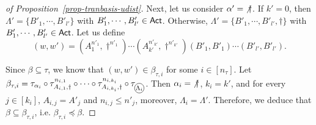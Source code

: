 \begin{proof}[of Proposition~\ref{prop-tranbasis-udist}]
Next, let us consider $\alpha' = {\not \dag}$. If $k' = 0$, then $\Lambda' = \{B'_1, \cdots, B'_{l'}\}$ with $B'_{1}, \cdots, B'_{ l'} \in {\sf Act}$. Otherwise,  $\Lambda' = \{ B'_{1}, \cdots, B'_{l'}, \dag\}$ with $B'_{1}, \cdots, B'_{ l'} \in {\sf Act}$.
Let us define 
$$(w, w') = (A^{n'_{1}}_{1}, \dag^{n'_{1}}) \cdots (A^{n'_{k'}}_{k'}, \dag^{n'_{ k'}}) (B'_{1}, B'_{1}) \cdots (B'_{ l'}, B'_{ l'}).$$

Since $\beta \subseteq \tau$, we know that $(w, w') \in \beta_{\tau, i}$ for some $i \in [n_\tau]$. 
Let $ \beta_{\tau, i} = \tau_{\alpha_i} \circ \tau^{n_{i,1}}_{A_{i,1}, \dag} \circ \cdots \circ  \tau^{n_{i, k_i}}_{A_{i,k_i}, \dag} \circ \tau_{\mathcircled{\Lambda_i}}$.
%
Then $\alpha_i = {\not \dag}$, $k_i = k'$, and for every $j \in [k_i]$, $A_{i, j} = A'_{j}$ and $n_{i, j} \le n'_{ j}$, moreover, $\Lambda_i = \Lambda'$.
Therefore, we deduce that $\beta \subseteq \beta_{\tau, i}$, i.e. $\beta_{\tau, i} \preceq \beta$.
\end{proof}

